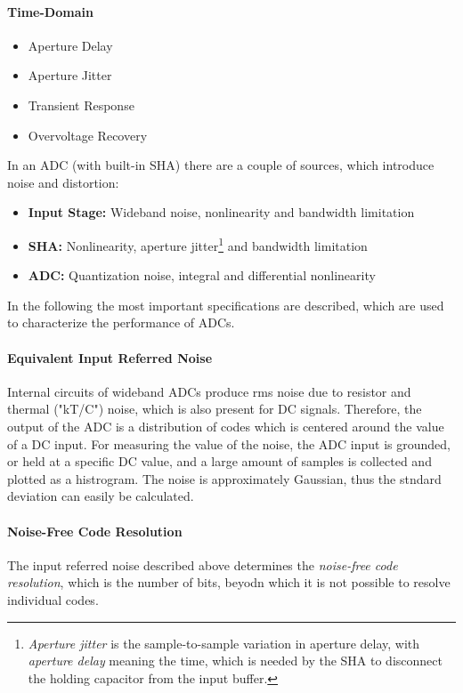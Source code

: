 \paragraph{Time-Domain}
\begin{itemize}
	\item Aperture Delay
	\item Aperture Jitter
	\item Transient Response
	\item Overvoltage Recovery
\end{itemize}


In an ADC (with built-in SHA) there are a couple of sources, which introduce noise and distortion:
\begin{itemize}
	\item \textbf{Input Stage:} Wideband noise, nonlinearity and bandwidth limitation
	\item \textbf{SHA:} Nonlinearity, aperture jitter\footnote{\textit{Aperture jitter} is the sample-to-sample variation in aperture delay, with \textit{aperture delay} meaning the time, which is needed by the SHA to disconnect the holding capacitor from the input buffer.} and bandwidth limitation
	\item \textbf{ADC:} Quantization noise, integral and differential nonlinearity
\end{itemize}
In the following the most important specifications are described, which are used to characterize the performance of ADCs.



\paragraph{Equivalent Input Referred Noise}
Internal circuits of wideband ADCs produce rms noise due to resistor and thermal ("kT/C") noise, which is also present for DC signals. Therefore, the output of the ADC is a distribution of codes which is centered around the value of a DC input. For measuring the value of the noise, the ADC input is grounded, or held at a specific DC value, and a large amount of samples is collected and plotted as a histrogram. The noise is approximately Gaussian, thus the stndard deviation can easily be calculated.

\paragraph{Noise-Free Code Resolution}
The input referred noise described above determines the \textit{noise-free code resolution}, which is the number of bits, beyodn which it is not possible to resolve individual codes.
\cite{walt}


